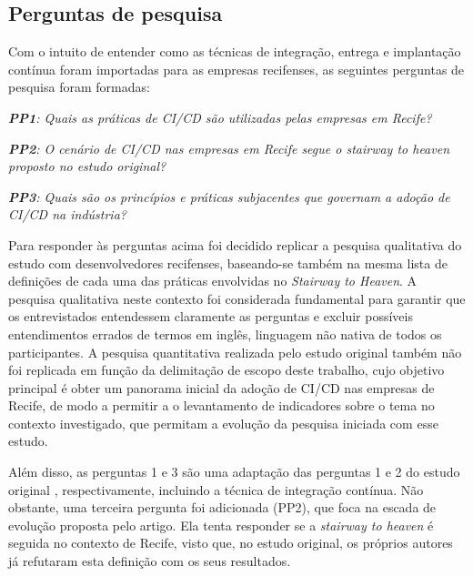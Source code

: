 \subsection{Perguntas de pesquisa} 
Com o intuito de entender como as técnicas de integração, entrega e implantação contínua foram importadas para as empresas recifenses, as seguintes perguntas de pesquisa foram formadas:

\vspace{2mm}

\textit{\textbf{PP1}:  Quais as práticas de CI/CD são utilizadas pelas empresas em Recife?}

\vspace{1mm}

\textit{\textbf{PP2}: O cenário de CI/CD nas empresas em Recife segue o \emph{stairway to heaven} proposto no estudo original?}

\vspace{1mm}

\textit{\textbf{PP3}: Quais são os princípios e práticas subjacentes que governam a adoção de CI/CD na indústria?}

\vspace{2mm}

Para responder às perguntas acima foi decidido replicar a pesquisa qualitativa do estudo \cite{empiricalStudy2016} com desenvolvedores recifenses, baseando-se também na mesma lista de definições de cada uma das práticas envolvidas no \emph{Stairway to Heaven}. A pesquisa qualitativa neste contexto foi considerada fundamental para garantir que os entrevistados entendessem claramente as perguntas e excluir possíveis entendimentos errados de termos em inglês, linguagem não nativa de todos os participantes. A pesquisa quantitativa realizada pelo estudo original também não foi replicada em função da delimitação de escopo deste trabalho, cujo objetivo principal é obter um panorama inicial da adoção de CI/CD nas empresas de Recife, de modo a permitir a o levantamento de indicadores sobre o tema no contexto investigado, que permitam a evolução da pesquisa iniciada com esse estudo.

Além disso, as perguntas 1 e 3 são uma adaptação das perguntas 1 e 2 do estudo original \cite{empiricalStudy2016}, respectivamente, incluindo a técnica de integração contínua. Não obstante, uma terceira pergunta foi adicionada (PP2), que foca na escada de evolução proposta pelo artigo. Ela tenta responder se a \emph{stairway to heaven} é seguida no contexto de Recife, visto que, no estudo original, os próprios autores já refutaram esta definição com os seus resultados.
